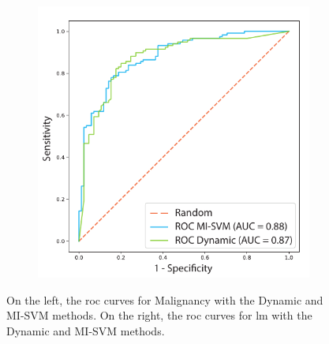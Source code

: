 \documentclass[journal,article,submit,moreauthors,pdftex, applsci]{Definitions/mdpi}
\begin{document}
\begin{figure}[H]
\begin{subfigure}{.45\linewidth}
        \includegraphics[width=\linewidth]{Figures/Result_LMM.pdf}
    \end{subfigure} 
    
    \caption{On the left, the \ac{roc} curves for Malignancy with the Dynamic and MI-SVM methods. On the right, the \ac{roc} curves for \ac{lm} with the Dynamic and MI-SVM methods.}
    \label{fig:roc_results}
\end{figure}

\end{document}
